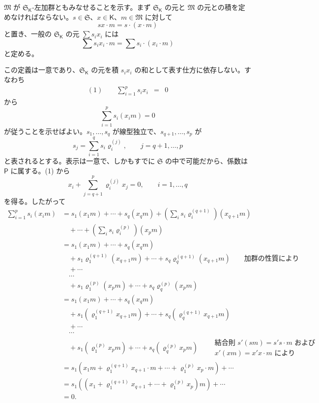 $\mathfrak M$ が $\mathfrak S_{\mathsf K}$-左加群ともみなせることを示す。まず $\mathfrak S_{\mathsf K}$ の元と $\mathfrak M$ の元との積を定めなければならない。$s\in\mathfrak S$、$x\in\mathsf K$、$m\in\mathfrak M$ に対して
\[
sx\cdot m=s\cdot(x\cdot m)
\]
と置き、一般の $\mathfrak S_{\mathsf K}$ の元 $\sum s_ix_i$ には
\[
\sum s_ix_i\cdot m=\sum s_i\cdot(x_i\cdot m)
\]
と定める。

この定義は一意であり、$\mathfrak S_{\mathsf K}$ の元を積 $s_ix_i$ の和として表す仕方に依存しない。すなわち
\[
\begin{array}{rcl}
(1)\qquad \displaystyle\sum_{i=1}^{p}s_ix_i&=&0
\end{array}
\]
から
\[
\sum_{i=1}^{p}s_i(x_i m)=0
\]
が従うことを示せばよい。$s_1,\ldots,s_q$ が線型独立で、$s_{q+1},\ldots,s_p$ が
\[
s_j=\sum_{i=1}^{q}s_i\varrho_i^{(j)},\qquad j=q+1,\ldots,p
\]
と表されるとする。表示は一意で、しかもすでに $\mathfrak S$ の中で可能だから、係数は $\mathsf P$ に属する。(1) から
\[
x_i+\sum_{j=q+1}^{p}\varrho_i^{(j)}x_j=0,\qquad i=1,\ldots,q
\]
を得る。したがって
\[
\begin{aligned}
\sum_{i=1}^{p}s_i(x_i m)
&=s_1(x_1m)+\cdots+s_q(x_qm)
  +\left(\sum_i s_i\varrho_i^{(q+1)}\right)(x_{q+1}m)\\
&\quad+\cdots+\left(\sum_i s_i\varrho_i^{(p)}\right)(x_pm)\\
&=s_1(x_1m)+\cdots+s_q(x_qm)\\
&\quad+s_1\varrho_1^{(q+1)}(x_{q+1}m)+\cdots+s_q\varrho_q^{(q+1)}(x_{q+1}m)
  \qquad\text{加群の性質により}\\
&\quad+\cdots\\
&\quad\cdots\\
&\quad+s_1\varrho_1^{(p)}(x_pm)+\cdots+s_q\varrho_q^{(p)}(x_pm)\\
&=s_1(x_1m)+\cdots+s_q(x_qm)\\
&\quad+s_1(\varrho_1^{(q+1)}x_{q+1}m)+\cdots+s_q(\varrho_q^{(q+1)}x_{q+1}m)\\
&\quad+\cdots\\
&\quad\cdots\\
&\quad+s_1(\varrho_1^{(p)}x_pm)+\cdots+s_q(\varrho_q^{(p)}x_pm)
  \qquad\begin{gathered}\text{結合則 }s'(sm)=s's\cdot m\text{ および}\\ x'(xm)=x'x\cdot m\text{ により}\end{gathered}\\
&=s_1\left(x_1m+\varrho_1^{(q+1)}x_{q+1}\cdot m+\cdots+\varrho_1^{(p)}x_p\cdot m\right)+\cdots\\
&=s_1\left(\left(x_1+\varrho_1^{(q+1)}x_{q+1}+\cdots+\varrho_1^{(p)}x_p\right)m\right)+\cdots\\
&=0.
\end{aligned}
\]

